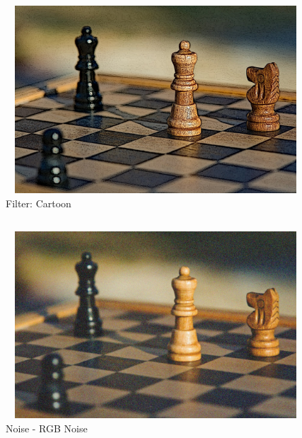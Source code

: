 \documentclass[12pt, a4]{article}
\begin{document}
\subsection*{}
\begin{figure}[h]
\centering
\caption{Filter: Cartoon}
\includegraphics[height=7cm, width=12cm]{Filters/Chess-Cartoon.jpeg}
\end{figure}

\subsection*{}
\begin{figure}[h]
\centering
\caption{Noise - RGB Noise}
\includegraphics[height=7cm, width=12cm]{Noise/Chess-RGBNoise.jpeg}
\end{figure}

\newpage
\end{document}
